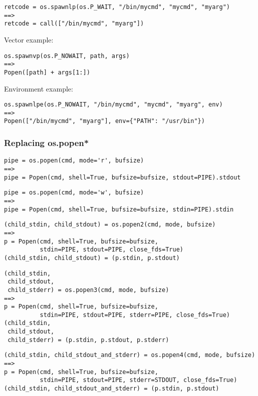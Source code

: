\begin{verbatim}
retcode = os.spawnlp(os.P_WAIT, "/bin/mycmd", "mycmd", "myarg")
==>
retcode = call(["/bin/mycmd", "myarg"])
\end{verbatim}

Vector example:

\begin{verbatim}
os.spawnvp(os.P_NOWAIT, path, args)
==>
Popen([path] + args[1:])
\end{verbatim}

Environment example:

\begin{verbatim}
os.spawnlpe(os.P_NOWAIT, "/bin/mycmd", "mycmd", "myarg", env)
==>
Popen(["/bin/mycmd", "myarg"], env={"PATH": "/usr/bin"})
\end{verbatim}

\subsubsection{Replacing os.popen*}

\begin{verbatim}
pipe = os.popen(cmd, mode='r', bufsize)
==>
pipe = Popen(cmd, shell=True, bufsize=bufsize, stdout=PIPE).stdout
\end{verbatim}

\begin{verbatim}
pipe = os.popen(cmd, mode='w', bufsize)
==>
pipe = Popen(cmd, shell=True, bufsize=bufsize, stdin=PIPE).stdin
\end{verbatim}

\begin{verbatim}
(child_stdin, child_stdout) = os.popen2(cmd, mode, bufsize)
==>
p = Popen(cmd, shell=True, bufsize=bufsize,
          stdin=PIPE, stdout=PIPE, close_fds=True)
(child_stdin, child_stdout) = (p.stdin, p.stdout)
\end{verbatim}

\begin{verbatim}
(child_stdin,
 child_stdout,
 child_stderr) = os.popen3(cmd, mode, bufsize)
==>
p = Popen(cmd, shell=True, bufsize=bufsize,
          stdin=PIPE, stdout=PIPE, stderr=PIPE, close_fds=True)
(child_stdin,
 child_stdout,
 child_stderr) = (p.stdin, p.stdout, p.stderr)
\end{verbatim}

\begin{verbatim}
(child_stdin, child_stdout_and_stderr) = os.popen4(cmd, mode, bufsize)
==>
p = Popen(cmd, shell=True, bufsize=bufsize,
          stdin=PIPE, stdout=PIPE, stderr=STDOUT, close_fds=True)
(child_stdin, child_stdout_and_stderr) = (p.stdin, p.stdout)
\end{verbatim}

